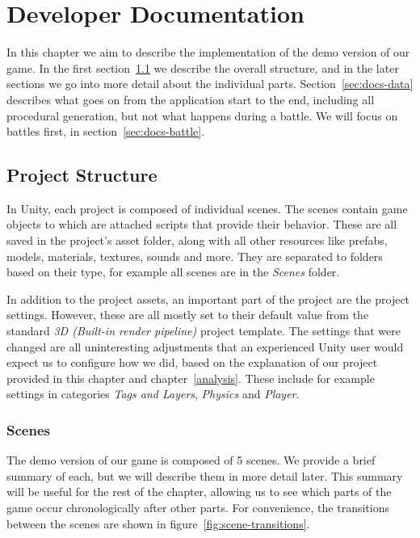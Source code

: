 \chapter{Developer Documentation}

In this chapter we aim to describe the implementation of the demo version of our game.
In the first section~\ref{sec:docs-proj} we describe the overall structure, and in the later sections we go into more detail about the individual parts.
Section~\ref{sec:docs-data} describes what goes on from the application start to the end, including all procedural generation, but not what happens during a battle.
We will focus on battles first, in section~\ref{sec:docs-battle}.

\section{Project Structure}\label{sec:docs-proj}

In Unity, each project is composed of individual scenes.
The scenes contain game objects to which are attached scripts that provide their behavior.
These are all saved in the project's asset folder, along with all other resources like prefabs, models, materials, textures, sounds and more.
They are separated to folders based on their type, for example all scenes are in the \emph{Scenes} folder.

In addition to the project assets, an important part of the project are the project settings.
However, these are all mostly set to their default value from the standard \emph{3D (Built-in render pipeline)} project template.
The settings that were changed are all uninteresting adjustments that an experienced Unity user would expect us to configure how we did, based on the explanation of our project provided in this chapter and chapter~\ref{analysis}.
These include for example settings in categories \emph{Tags and Layers}, \emph{Physics} and \emph{Player}.

\subsection{Scenes}\label{sec:docs-scenes}

The demo version of our game is composed of 5 scenes.
We provide a brief summary of each, but we will describe them in more detail later.
This summary will be useful for the rest of the chapter, allowing us to see which parts of the game occur chronologically after other parts.
For convenience, the transitions between the scenes are shown in figure~\ref{fig:scene-transitions}.

